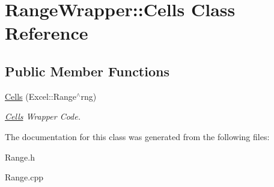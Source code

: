 \hypertarget{class_range_wrapper_1_1_cells}{}\section{Range\+Wrapper\+:\+:Cells Class Reference}
\label{class_range_wrapper_1_1_cells}
\subsection*{Public Member Functions}
\begin{DoxyCompactItemize}
\item 
\hypertarget{class_range_wrapper_1_1_cells_a60560584fe63b17c6cc1045f81313aca}{}\hyperlink{class_range_wrapper_1_1_cells_a60560584fe63b17c6cc1045f81313aca}{Cells} (Excel\+::\+Range$^\wedge$rng)\label{class_range_wrapper_1_1_cells_a60560584fe63b17c6cc1045f81313aca}

\begin{DoxyCompactList}\small\item\em \hyperlink{class_range_wrapper_1_1_cells}{Cells} Wrapper Code. \end{DoxyCompactList}\end{DoxyCompactItemize}


The documentation for this class was generated from the following files\+:\begin{DoxyCompactItemize}
\item 
Range.\+h\item 
Range.\+cpp\end{DoxyCompactItemize}
